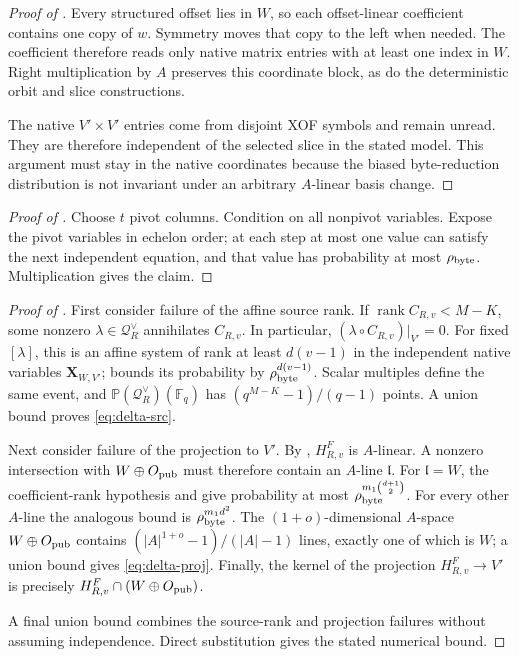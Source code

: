 \documentclass[11pt]{article}
\newcommand{\F}{\mathbb F}
\newcommand{\rank}{\operatorname{rank}}
\begin{document}
\begin{proof}[Proof of ]
Every structured offset lies in $W$, so each offset-linear coefficient
contains one copy of $w$.  Symmetry moves that copy to the left when needed.
The coefficient therefore reads only native matrix entries with at least one
index in $W$.  Right multiplication by $A$ preserves this coordinate block,
as do the deterministic orbit and slice constructions.

The native $V'\times V'$ entries come from disjoint XOF symbols and remain
unread.  They are therefore independent of the selected slice in the stated
model.  This argument must stay in the native coordinates because the biased
byte-reduction distribution is not invariant under an arbitrary $A$-linear
basis change.
\end{proof}

\begin{proof}[Proof of ]
Choose $t$ pivot columns.  Condition on all nonpivot variables.  Expose the
pivot variables in echelon order; at each step at most one value can satisfy
the next independent equation, and that value has probability at most
$\rho_{\rm byte}$.  Multiplication gives the claim.
\end{proof}

\begin{proof}[Proof of ]
First consider failure of the affine source rank.  If
$\rank C_{R,v}<M-K$, some nonzero
$\lambda\in\mathcal Q_R^\vee$ annihilates $C_{R,v}$.  In particular,
$(\lambda\circ C_{R,v})|_{V'}=0$.  For fixed $[\lambda]$, this is an affine
system of rank at least $d(v-1)$ in the independent native variables
$\mathbf X_{W,V'}$;  bounds its probability by
$\rho_{\rm byte}^{d(v-1)}$.  Scalar multiples define the same event, and
$\mathbb P(\mathcal Q_R^\vee)(\F_q)$ has
$(q^{M-K}-1)/(q-1)$ points.  A union bound proves
\eqref{eq:delta-src}.

Next consider failure of the projection to $V'$.  By
, $H^F_{R,v}$ is $A$-linear.  A nonzero intersection
with $W\oplus O_{\rm pub}$ must therefore contain an $A$-line $\mathfrak l$.
For $\mathfrak l=W$, the coefficient-rank hypothesis and
 give probability at most
$\rho_{\rm byte}^{m_1\binom{d+1}{2}}$.  For every other $A$-line the
analogous bound is $\rho_{\rm byte}^{m_1d^2}$.  The $(1+o)$-dimensional
$A$-space $W\oplus O_{\rm pub}$ contains
$(|A|^{1+o}-1)/(|A|-1)$ lines, exactly one of which is $W$; a union bound
gives \eqref{eq:delta-proj}.  Finally, the kernel of the projection
$H^F_{R,v}\to V'$ is precisely
$H^F_{R,v}\cap(W\oplus O_{\rm pub})$.

A final union bound combines the source-rank and projection failures without
assuming independence.  Direct substitution gives the stated numerical
bound.
\end{proof}
\end{document}

